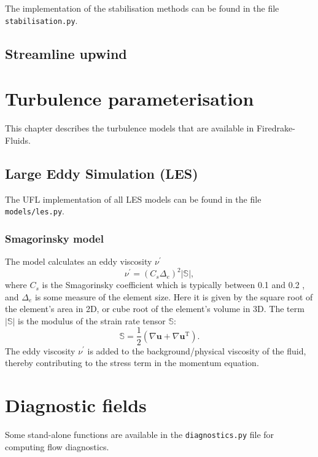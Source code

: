 \documentclass[a4paper,11pt]{report}
\begin{document}
The implementation of the stabilisation methods can be found in the file \texttt{stabilisation.py}.

\section{Streamline upwind}


\chapter{Turbulence parameterisation}\label{chap:turbulence_parameterisation}
This chapter describes the turbulence models that are available in Firedrake-Fluids.

\section{Large Eddy Simulation (LES)}
The UFL implementation of all LES models can be found in the file \texttt{models/les.py}.

\subsection{Smagorinsky model}
The \cite{Smagorinsky_1963} model calculates an eddy viscosity $\nu^\prime$
\begin{equation}
   \nu^\prime = \left(C_s\Delta_e\right)^2|\mathbb{S}|,
\end{equation}
where $C_s$ is the Smagorinsky coefficient which is typically between 0.1 and 0.2 \citep{Deardorff_1971}, and $\Delta_e$ is some measure of the element size. Here it is given by the square root of the element's area in 2D, or cube root of the element's volume in 3D. The term $|\mathbb{S}|$ is the modulus of the strain rate tensor $\mathbb{S}$:
\begin{equation}
 \mathbb{S} = \frac{1}{2}\left(\nabla\mathbf{u} + \nabla\mathbf{u}^{\mathrm{T}}\right).
\end{equation}
The eddy viscosity $\nu^\prime$ is added to the background/physical viscosity of the fluid, thereby contributing to the stress term in the momentum equation.

\chapter{Diagnostic fields}
Some stand-alone functions are available in the \texttt{diagnostics.py} file for computing flow diagnostics.
\end{document}
